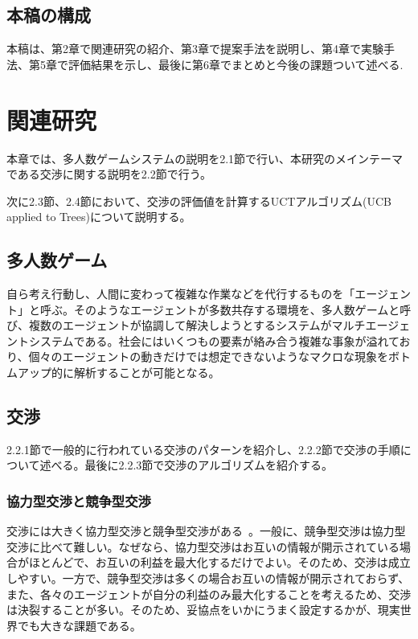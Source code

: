 \documentclass[a4, 10pt,dvipdfmx]{jsarticle}
\begin{document}
\subsection{本稿の構成}

本稿は、第2章で関連研究の紹介、第3章で提案手法を説明し、第4章で実験手法、第5章で評価結果を示し、最後に第6章でまとめと今後の課題ついて述べる.


\section{関連研究}

本章では、多人数ゲームシステムの説明を2.1節で行い、本研究のメインテーマである交渉に関する説明を2.2節で行う。

次に2.3節、2.4節において、交渉の評価値を計算するUCTアルゴリズム(UCB applied to Trees)について説明する。

\subsection{多人数ゲーム}
自ら考え行動し、人間に変わって複雑な作業などを代行するものを「エージェント」と呼ぶ。そのようなエージェントが多数共存する環境を、多人数ゲームと呼び、複数のエージェントが協調して解決しようとするシステムがマルチエージェントシステムである。社会にはいくつもの要素が絡み合う複雑な事象が溢れており、個々のエージェントの動きだけでは想定できないようなマクロな現象をボトムアップ的に解析することが可能となる。

\subsection{交渉}
2.2.1節で一般的に行われている交渉のパターンを紹介し、2.2.2節で交渉の手順について述べる。最後に2.2.3節で交渉のアルゴリズムを紹介する。

\subsubsection{協力型交渉と競争型交渉}
交渉には大きく協力型交渉と競争型交渉がある~\cite{anguix2013complex}。一般に、競争型交渉は協力型交渉に比べて難しい。なぜなら、協力型交渉はお互いの情報が開示されている場合がほとんどで、お互いの利益を最大化するだけでよい。そのため、交渉は成立しやすい。一方で、競争型交渉は多くの場合お互いの情報が開示されておらず、また、各々のエージェントが自分の利益のみ最大化することを考えるため、交渉は決裂することが多い。そのため、妥協点をいかにうまく設定するかが、現実世界でも大きな課題である。
\end{document}
